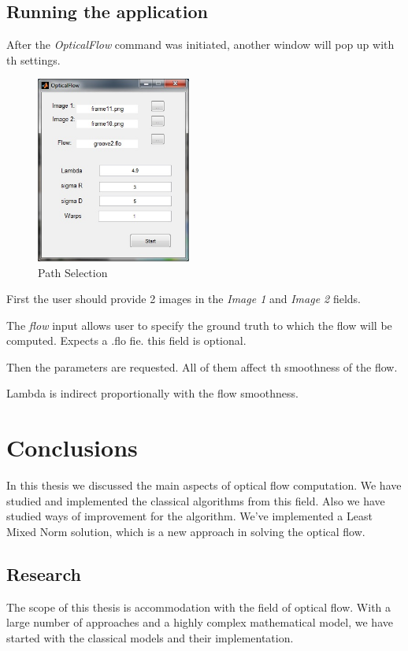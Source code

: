 \documentclass[12pt,a4paper,twoside]{report}
\begin{document}
{\section{Running the application}

After the \textit{OpticalFlow} command was initiated, another window will pop up with th settings.

		\begin{figure}
			\centering
			\includegraphics[width = 2in]{img/inputwindow}
			\caption{Path Selection}
		\end{figure}
		
First the user should provide 2 images in the \textit{Image 1} and \textit{Image 2} fields. 

The \textit{flow} input allows user to specify the ground truth to which the flow will be computed. Expects a .flo fie. this field is optional.

Then the parameters are requested. All of them affect th smoothness of the flow.

Lambda is indirect proportionally with the flow smoothness.

\chapter{Conclusions}

In this thesis we discussed the main aspects of optical flow computation. We have studied and implemented the classical algorithms from this field. Also we have studied ways of improvement for the algorithm. We've implemented a Least Mixed Norm solution, which is a new approach in solving the optical flow.


\section{Research}
The scope of this thesis is accommodation with the field of optical flow. With a large number of approaches and a highly complex mathematical model, we have started with the classical models and their implementation. 

}
\end{document}
